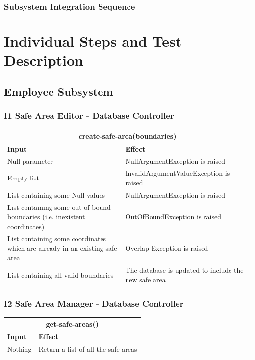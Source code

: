 \documentclass{article}
\begin{document}
\newpage


\newpage
\subsubsection{Subsystem Integration Sequence}


\newpage
\section{Individual Steps and Test Description}
\subsection{Employee Subsystem}
\subsubsection{I1 Safe Area Editor - Database Controller}
\begin{tabular}{ |p{5cm}|p{7cm}| }
  \hline
  \multicolumn{2}{|c|}{create-safe-area(boundaries)} \\
  \hline
  \textbf{Input} & \textbf{Effect} \\
  \hline
  Null parameter & NullArgumentException is raised\\
  \hline
  Empty list & InvalidArgumentValueException is raised\\
  \hline
  List containing some Null values & NullArgumentException is raised\\
  \hline
  List containing some out-of-bound boundaries (i.e. inexistent coordinates) & OutOfBoundException is raised\\
  \hline
  List containing some coordinates which are already in an existing safe area & Overlap Exception is raised\\
  \hline
  List containing all valid boundaries & The database is updated to include the new safe area\\
  \hline
\end{tabular}
\subsubsection{I2 Safe Area Manager - Database Controller}
\begin{tabular}{ |p{5cm}|p{7cm}| }
  \hline
  \multicolumn{2}{|c|}{get-safe-areas()} \\
  \hline
  \textbf{Input} & \textbf{Effect} \\
  \hline
  Nothing & Return a list of all the safe areas\\
  \hline
\end{tabular}
\end{document}
